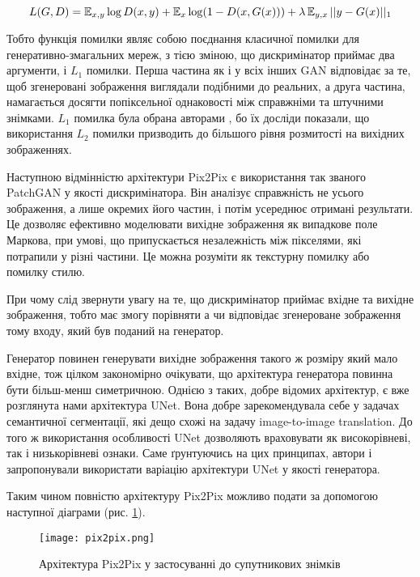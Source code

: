 \begin{equation} \label{eq:pix2pix_loss}
    L(G, D) = \operatorname{\mathbb{E}}_{x, y} \log D(x,y) +
    \operatorname{\mathbb{E}}_{x} \log (1 - D(x, G(x))) +
    \lambda \operatorname{\mathbb{E}}_{y, x} ||y - G(x)||_1
\end{equation}

Тобто функція помилки являє собою поєднання класичної помилки
для генеративно-змагальних мереж, з тією зміною, що дискримінатор приймає
два аргументи, і $L_1$ помилки. Перша частина як і у всіх інших
GAN відповідає за те, щоб згенеровані зображення виглядали подібними
до реальних, а друга частина, намагається досягти
попіксельної однаковості між справжніми та штучними знімками.
$L_1$ помилка була обрана авторами \cite{pix2pix}, бо їх досліди
показали, що використання $L_2$ помилки призводить до більшого
рівня розмитості на вихідних зображеннях.

Наступною відмінністю архітектури Pix2Pix є використання так званого
PatchGAN у якості дискримінатора. Він аналізує справжність не усього
зображення, а лише окремих його частин, і потім усереднює отримані результати.
Це дозволяє ефективно моделювати вихідне зображення як
випадкове поле Маркова, при умові, що припускається
незалежність між пікселями, які потрапили у різні частини.
Це можна розуміти \cite{pix2pix} як текстурну помилку або помилку стилю.

При чому слід звернути увагу на те, що дискримінатор приймає
вхідне та вихідне зображення, тобто має змогу
порівняти а чи відповідає згенероване зображення тому
входу, який був поданий на генератор.

Генератор повинен генерувати вихідне зображення такого ж
розміру який мало вхідне, тож цілком закономірно очікувати,
що архітектура генератора повинна бути більш-менш симетричною.
Однією з таких, добре відомих архітектур, є вже розглянута
нами архітектура UNet. Вона добре зарекомендувала себе у
задачах семантичної сегментації, які дещо схожі на задачу image-to-image translation.
До того ж використання особливості UNet дозволяють враховувати як
високорівневі, так і низькорівневі ознаки. Саме ґрунтуючись на цих
принципах, автори \cite{pix2pix} і запропонували використати
варіацію архітектури UNet у якості генератора.

Таким чином повністю архітектуру Pix2Pix можливо подати за допомогою наступної
діаграми (рис. \ref{fig:pix2pix}).

\begin{figure}[!ht]
    \centering
    \texttt{[image: pix2pix.png]}
    \caption{Архітектура Pix2Pix у застосуванні до супутникових знімків}
    \label{fig:pix2pix}
\end{figure}

